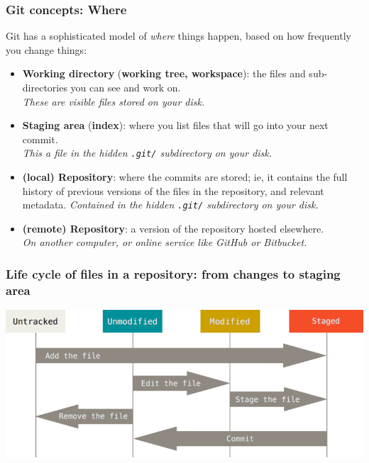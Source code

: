 \documentclass[10pt,svgnames,handout]{beamer}
\begin{document}
\begin{frame}
\frametitle{Git concepts: Where}

Git has a sophisticated model of \emph{where} things happen, based on how frequently you change things:

\begin{itemize}
\item \textbf{Working directory} (\textbf{working tree, workspace}): the files and sub-directories you can see and work on.\\
\emph{These are visible files stored on your disk.}
\smallskip

\item \textbf{Staging area} (\textbf{index}): where you list files that will go into your next commit.\\
\emph{This a file in the hidden \texttt{.git/} subdirectory on your disk.}\smallskip

\item \textbf{(local) Repository}: where the commits are stored; ie, it contains the full history of previous versions of the files in the repository, and relevant metadata.
\emph{Contained in the hidden \texttt{.git/} subdirectory on your disk.}
\smallskip

\item \textbf{(remote) Repository}: a version of the repository hosted elsewhere.\\
\emph{On another computer, or online service like GitHub or Bitbucket.}
\end{itemize}
\end{frame}


\begin{frame}
\frametitle{Life cycle of files in a repository: from changes to staging area}
\begin{centering}
\includegraphics[width=\linewidth]{figures/lifecycle.png}
\end{centering}
\end{frame}
\end{document}
